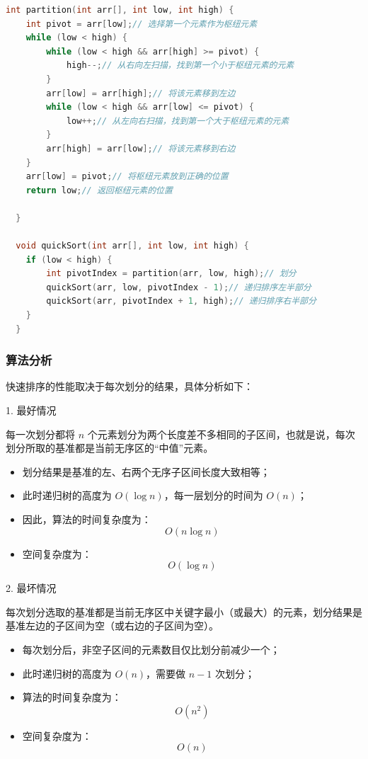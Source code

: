 \documentclass[lang=cn,newtx,10pt,scheme=chinese]{elegantbook}
\begin{document}
\begin{lstlisting}[language=C++, caption=快速排序的算法代码]
  int partition(int arr[], int low, int high) {
    int pivot = arr[low];// 选择第一个元素作为枢纽元素
    while (low < high) {
        while (low < high && arr[high] >= pivot) {
            high--;// 从右向左扫描，找到第一个小于枢纽元素的元素
        }
        arr[low] = arr[high];// 将该元素移到左边
        while (low < high && arr[low] <= pivot) {
            low++;// 从左向右扫描，找到第一个大于枢纽元素的元素
        }
        arr[high] = arr[low];// 将该元素移到右边
    }
    arr[low] = pivot;// 将枢纽元素放到正确的位置
    return low;// 返回枢纽元素的位置

  }

  void quickSort(int arr[], int low, int high) {
    if (low < high) {
        int pivotIndex = partition(arr, low, high);// 划分
        quickSort(arr, low, pivotIndex - 1);// 递归排序左半部分
        quickSort(arr, pivotIndex + 1, high);// 递归排序右半部分
    }
  }
\end{lstlisting}

\subsubsection{算法分析}

快速排序的性能取决于每次划分的结果，具体分析如下：

1. 最好情况  

   每一次划分都将 $n$ 个元素划分为两个长度差不多相同的子区间，也就是说，每次划分所取的基准都是当前无序区的“中值”元素。  
   \begin{itemize}
     \item 划分结果是基准的左、右两个无序子区间长度大致相等；
     \item 此时递归树的高度为 $O(\log n)$，每一层划分的时间为 $O(n)$；
     \item 因此，算法的时间复杂度为：
       \[
       O(n \log n)
       \]
     \item 空间复杂度为：
       \[
       O(\log n)
       \]
   \end{itemize}

2. 最坏情况  

   每次划分选取的基准都是当前无序区中关键字最小（或最大）的元素，划分结果是基准左边的子区间为空（或右边的子区间为空）。  
   \begin{itemize}
     \item 每次划分后，非空子区间的元素数目仅比划分前减少一个；
     \item 此时递归树的高度为 $O(n)$，需要做 $n-1$ 次划分；
     \item 算法的时间复杂度为：
       \[
       O(n^2)
       \]
     \item 空间复杂度为：
       \[
       O(n)
       \]
   \end{itemize}
\end{document}
